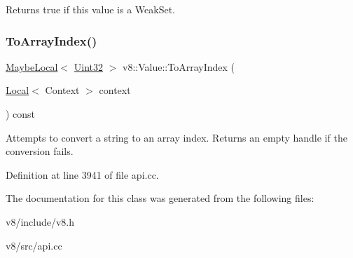 Returns true if this value is a Weak\+Set. \mbox{\label{classv8_1_1Value_a75222c1f1452036a5aab9faadbbc9136}} 
\subsubsection{\texorpdfstring{To\+Array\+Index()}{ToArrayIndex()}}
{\footnotesize\ttfamily \mbox{\hyperlink{classv8_1_1MaybeLocal}{Maybe\+Local}}$<$ \mbox{\hyperlink{classv8_1_1Uint32}{Uint32}} $>$ v8\+::\+Value\+::\+To\+Array\+Index (\begin{DoxyParamCaption}\item[{\mbox{\hyperlink{classv8_1_1Local}{Local}}$<$ Context $>$}]{context }\end{DoxyParamCaption}) const}

Attempts to convert a string to an array index. Returns an empty handle if the conversion fails. 

Definition at line 3941 of file api.\+cc.



The documentation for this class was generated from the following files\+:\begin{DoxyCompactItemize}
\item 
v8/include/v8.\+h\item 
v8/src/api.\+cc\end{DoxyCompactItemize}
